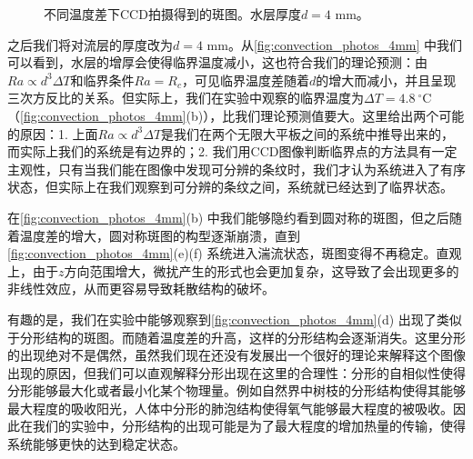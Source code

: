 \documentclass[font=default]{mpltx}
\begin{document}
\begin{figure}
    \caption{不同温度差下CCD拍摄得到的斑图。水层厚度$d=4$ mm。}
    \label{fig:convection_photos_4mm}
\end{figure}

之后我们将对流层的厚度改为$d=4$ mm。从\autoref{fig:convection_photos_4mm} 中我们可以看到，水层的增厚会使得临界温度减小，这也符合我们的理论预测：由$Ra\propto d^3\Delta T$和临界条件$Ra=R_c$，可见临界温度差随着$d$的增大而减小，并且呈现三次方反比的关系。但实际上，我们在实验中观察的临界温度为$\Delta T=4.8\ ^\circ\text{C}$（\autoref{fig:convection_photos_4mm}(b)），比我们理论预测值要大。这里给出两个可能的原因：1. 上面$Ra\propto d^3\Delta T$是我们在两个无限大平板之间的系统中推导出来的，而实际上我们的系统是有边界的；2. 我们用CCD图像判断临界点的方法具有一定主观性，只有当我们能在图像中发现可分辨的条纹时，我们才认为系统进入了有序状态，但实际上在我们观察到可分辨的条纹之间，系统就已经达到了临界状态。

在\autoref{fig:convection_photos_4mm}(b) 中我们能够隐约看到圆对称的斑图，但之后随着温度差的增大，圆对称斑图的构型逐渐崩溃，直到\autoref{fig:convection_photos_4mm}(e)(f) 系统进入湍流状态，斑图变得不再稳定。直观上，由于$z$方向范围增大，微扰产生的形式也会更加复杂，这导致了会出现更多的非线性效应，从而更容易导致耗散结构的破坏。

有趣的是，我们在实验中能够观察到\autoref{fig:convection_photos_4mm}(d) 出现了类似于分形结构的斑图。而随着温度差的升高，这样的分形结构会逐渐消失。这里分形的出现绝对不是偶然，虽然我们现在还没有发展出一个很好的理论来解释这个图像出现的原因，但我们可以直观解释分形出现在这里的合理性：分形的自相似性使得分形能够最大化或者最小化某个物理量。例如自然界中树枝的分形结构使得其能够最大程度的吸收阳光，人体中分形的肺泡结构使得氧气能够最大程度的被吸收。因此在我们的实验中，分形结构的出现可能是为了最大程度的增加热量的传输，使得系统能够更快的达到稳定状态。
\end{document}
